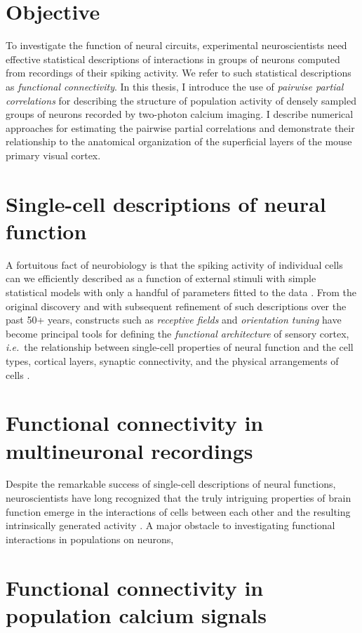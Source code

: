 \section{Objective}
To investigate the function of neural circuits, experimental neuroscientists need effective statistical descriptions of interactions in groups of neurons computed from recordings of their spiking activity. We refer to such statistical descriptions as \emph{functional connectivity}. In this thesis, I introduce the use of \emph{pairwise partial correlations} for describing the structure of population activity of densely sampled groups of neurons recorded by two-photon calcium imaging. I describe numerical approaches for estimating the pairwise partial correlations and demonstrate their relationship to the anatomical organization of the superficial layers of the mouse primary visual cortex.

\section{Single-cell descriptions of neural function}
A fortuitous fact of neurobiology is that the spiking activity of individual cells can we efficiently described as a function of external stimuli with simple statistical models with only a handful of parameters fitted to the data \citep{Carandini:2005}. From the original discovery and with subsequent refinement of such descriptions over the past 50+ years, constructs such as \emph{receptive fields} and \emph{orientation tuning} have become principal tools for defining the \emph{functional architecture} of sensory cortex, \emph{i.e.}\ the relationship between single-cell properties of neural function and the cell types, cortical layers, synaptic connectivity, and the physical arrangements of cells  \citep{Hubel:1962,Ohki:2005,Reid:2012}.

\section{Functional connectivity in multineuronal recordings}
Despite the remarkable success of single-cell descriptions of neural functions, neuroscientists have long recognized that the truly intriguing properties of brain function emerge in the interactions of cells between each other and the resulting intrinsically generated activity \citep{Yuste:2005}.  A major obstacle to investigating functional interactions in populations on neurons, 

\section{Functional connectivity in population calcium signals}
